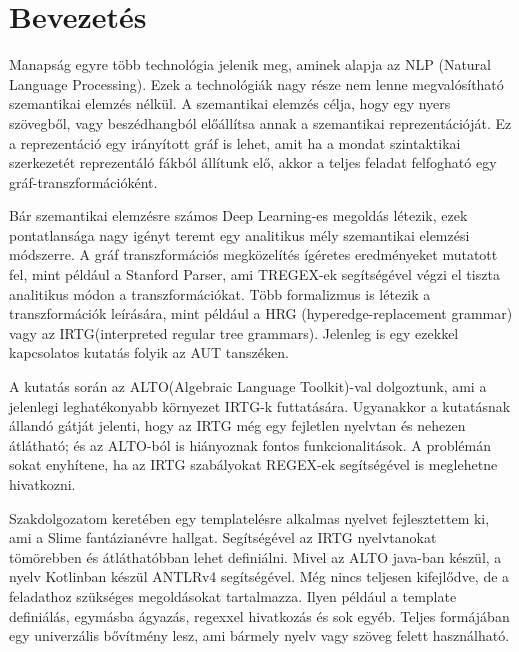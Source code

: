 \chapter{Bevezetés}

Manapság egyre több technológia jelenik meg, aminek alapja az NLP (Natural Language Processing). Ezek a technológiák nagy része nem lenne megvalósítható szemantikai elemzés nélkül. A szemantikai elemzés célja, hogy egy nyers szövegből, vagy beszédhangból előállítsa annak a szemantikai reprezentációját. Ez a reprezentáció egy irányított gráf is lehet, amit ha a mondat szintaktikai szerkezetét reprezentáló fákból állítunk elő, akkor a teljes feladat felfogható egy gráf-transzformációként. 

Bár szemantikai elemzésre számos Deep Learning-es megoldás létezik, ezek pontatlansága nagy igényt teremt egy analitikus mély szemantikai elemzési módszerre. A gráf transzformációs megközelítés ígéretes eredményeket mutatott fel, mint például a Stanford Parser, ami TREGEX-ek segítségével végzi el tiszta analitikus módon a transzformációkat.
Több formalizmus is létezik a transzformációk leírására, mint például a HRG (hyperedge-replacement grammar) vagy az IRTG(interpreted regular tree grammars). Jelenleg is egy ezekkel kapcsolatos kutatás folyik az AUT tanszéken.

A kutatás során az ALTO(Algebraic Language Toolkit)-val dolgoztunk, ami a jelenlegi leghatékonyabb környezet IRTG-k futtatására. Ugyanakkor a kutatásnak állandó gátját jelenti, hogy az IRTG még egy fejletlen nyelvtan és nehezen átlátható; és az ALTO-ból is hiányoznak fontos funkcionalitások. A problémán sokat enyhítene, ha az IRTG szabályokat REGEX-ek segítségével is meglehetne hivatkozni.

Szakdolgozatom keretében egy templatelésre alkalmas nyelvet fejlesztettem ki, ami a Slime fantázianévre hallgat. Segítségével az IRTG nyelvtanokat tömörebben és átláthatóbban lehet definiálni. Mivel az ALTO java-ban készül, a nyelv Kotlinban készül ANTLRv4 segítségével. Még nincs teljesen kifejlődve, de a feladathoz szükséges megoldásokat tartalmazza. Ilyen például a template definiálás, egymásba ágyazás, regexxel hivatkozás és sok egyéb. Teljes formájában egy univerzális bővítmény lesz, ami bármely nyelv vagy szöveg felett használható.
 	 	 	
